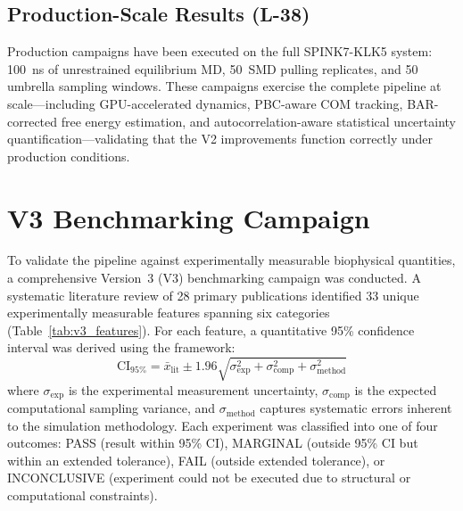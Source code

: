 \documentclass[conference]{IEEEtran}
\begin{document}
\subsection{Production-Scale Results (L-38)}

Production campaigns have been executed on the full SPINK7-KLK5 system:
100~ns of unrestrained equilibrium MD, 50~SMD pulling replicates, and 50
umbrella sampling windows.  These campaigns exercise the complete pipeline
at scale---including GPU-accelerated dynamics, PBC-aware COM tracking,
BAR-corrected free energy estimation, and autocorrelation-aware statistical
uncertainty quantification---validating that the V2 improvements function
correctly under production conditions.

\section{V3 Benchmarking Campaign}\label{sec:v3}

To validate the pipeline against experimentally measurable biophysical
quantities, a comprehensive Version~3 (V3) benchmarking campaign was
conducted.  A systematic literature review of 28 primary publications
identified 33 unique experimentally measurable features spanning six
categories (Table~\ref{tab:v3_features}).  For each feature, a
quantitative 95\% confidence interval was derived using the framework:
\begin{equation}\label{eq:ci_framework}
  \mathrm{CI}_{95\%} = \bar{x}_{\mathrm{lit}}
    \pm 1.96 \sqrt{\sigma_{\mathrm{exp}}^2
    + \sigma_{\mathrm{comp}}^2 + \sigma_{\mathrm{method}}^2}
\end{equation}
where $\sigma_{\mathrm{exp}}$ is the experimental measurement uncertainty,
$\sigma_{\mathrm{comp}}$ is the expected computational sampling variance,
and $\sigma_{\mathrm{method}}$ captures systematic errors inherent to the
simulation methodology.  Each experiment was classified into one of four
outcomes: PASS (result within 95\% CI), MARGINAL (outside 95\% CI but
within an extended tolerance), FAIL (outside extended tolerance), or
INCONCLUSIVE (experiment could not be executed due to structural or
computational constraints).
\end{document}
